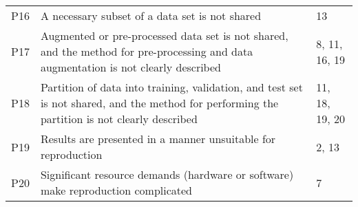 \begin{tabularx}{\textwidth}{lXl}
 P16 &  A necessary subset of a data set is not shared &  13 \\
 P17 &  Augmented or pre-processed data set is not shared, and the method for pre-processing and data augmentation is not clearly described &  8, 11, 16, 19 \\
 P18 &  Partition of data into training, validation, and test set is not shared, and the method for performing the partition is not clearly described &  11, 18, 19, 20 \\
 P19 &  Results are presented in a manner unsuitable for reproduction &  2, 13 \\
 P20 &  Significant resource demands (hardware or software) make reproduction complicated &  7 \\
\bottomrule
\end{tabularx}
